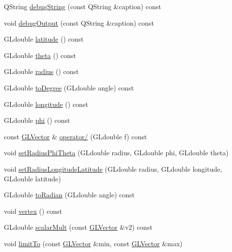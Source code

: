 \begin{DoxyCompactItemize}
\-Q\-String \hyperlink{classGLVector_a901db0ed0c94de90dc9ef3890f63a8f2}{debug\-String} (const \-Q\-String \&caption) const 
\item 
void \hyperlink{classGLVector_acf794d36606266d0cf9a01564f6cb0ce}{debug\-Output} (const \-Q\-String \&caption) const 
\item 
\-G\-Ldouble \hyperlink{classGLVector_a805eb8881b69be9dea3bbcd3a85ee9c6}{latitude} () const 
\item 
\-G\-Ldouble \hyperlink{classGLVector_aa2d36f539f039f6a1e1022d6cfc1a983}{theta} () const 
\item 
\-G\-Ldouble \hyperlink{classGLVector_abd8984744b5d57e4a7df0e7eb70b3fb1}{radius} () const 
\item 
\-G\-Ldouble \hyperlink{classGLVector_ab8e48840c3310332a1ef8ecc81ba9bf9}{to\-Degree} (\-G\-Ldouble angle) const 
\item 
\-G\-Ldouble \hyperlink{classGLVector_a0d7f20927c7d75d0aa240de15df89f5f}{longitude} () const 
\item 
\-G\-Ldouble \hyperlink{classGLVector_afb2a8da7c9d50e05bac63d8ef5c4bdf3}{phi} () const 
\item 
const \hyperlink{classGLVector}{\-G\-L\-Vector} \& \hyperlink{classGLVector_aba1e99c3b11a7c30b446f609ae219295}{operator/} (\-G\-Ldouble f) const 
\item 
void \hyperlink{classGLVector_a834ac35d0557ebfca2ac7c4a686927db}{set\-Radius\-Phi\-Theta} (\-G\-Ldouble radius, \-G\-Ldouble phi, \-G\-Ldouble theta)
\item 
void \hyperlink{classGLVector_aa987f3a2fa09380a4e7151df377b5771}{set\-Radius\-Longitude\-Latitude} (\-G\-Ldouble radius, \-G\-Ldouble longitude, \-G\-Ldouble latitude)
\item 
\-G\-Ldouble \hyperlink{classGLVector_a7baf1b11bf59b78064659dcc11db6253}{to\-Radian} (\-G\-Ldouble angle) const 
\item 
void \hyperlink{classGLVector_a050ef5239fb7a6d83ef5158c955fa006}{vertex} () const 
\item 
\-G\-Ldouble \hyperlink{classGLVector_a23499b64647ce6e3de2c633198deb78b}{scalar\-Mult} (const \hyperlink{classGLVector}{\-G\-L\-Vector} \&v2) const 
\item 
void \hyperlink{classGLVector_a5b5cd462d5adab754f0936f63510fc66}{limit\-To} (const \hyperlink{classGLVector}{\-G\-L\-Vector} \&min, const \hyperlink{classGLVector}{\-G\-L\-Vector} \&max)
\end{DoxyCompactItemize}
